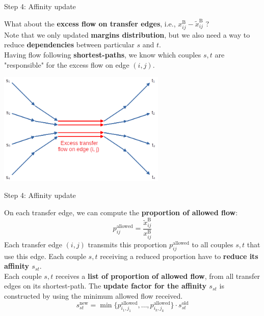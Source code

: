 \documentclass[10pt]{beamer}
\newcommand{\imp}[1]{\textbf{\color{cyan}#1}}
\begin{document}
	
	\begin{frame}{Step 4: Affinity update}
		
		What about the \imp{excess flow on transfer edges}, i.e., $x^\text{B}_{ij} - \widetilde{x}^\text{B}_{ij}$ ? \\
		\vspace{0.4cm}
		Note that we only updated \imp{margins distribution}, but we also need a way to reduce \imp{dependencies} between particular $s$ and $t$. \\
		\vspace{0.4cm}
		Having flow following \imp{shortest-paths}, we know which couples $s, t$ are "responsible" for the excess flow on edge $(i, j)$.
		\begin{center}
			\includegraphics[width=0.6\textwidth]{img/excess_flow.png}
		\end{center}
	\end{frame}
	
	
	\begin{frame}{Step 4: Affinity update}
		
		On each transfer edge, we can compute the \imp{proportion of allowed flow}:
		$$
			p^\text{allowed}_{ij} = \frac{\widetilde{x}_{ij}^\text{B}}{x_{ij}^\text{B}}
		$$
		Each transfer edge $(i,j)$ transmits this proportion $p^\text{allowed}_{ij}$ to all couples $s,t$ that use this edge. Each couple $s,t$ receiving a reduced proportion have to \imp{reduce its affinity $s_{st}$}. \\
		\vspace{0.4cm}
		Each couple $s,t$ receives a \imp{list of proportion of allowed flow}, from all transfer edges on its shortest-path. The \imp{update factor for the affinity $s_{st}$} is constructed by using the minimum allowed flow received.
		$$
			s^\text{new}_{st} = \min\{p^\text{allowed}_{i_1, j_1}, \ldots, p^\text{allowed}_{i_k, j_k} \} \cdot s^\text{old}_{st}
		$$
	\end{frame}
	
\end{document}
